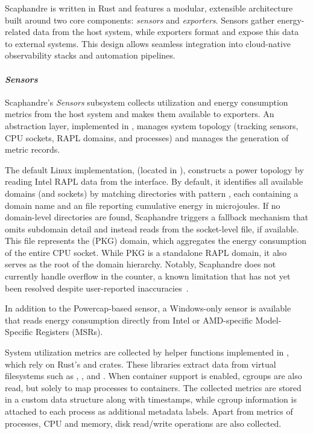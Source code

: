 Scaphandre is written in Rust and features a modular, extensible architecture built around two core components: \textit{sensors} and \textit{exporters}. Sensors gather energy-related data from the host system, while exporters format and expose this data to external systems. This design allows seamless integration into cloud-native observability stacks and automation pipelines.

\paragraph{\textit{Sensors}}

Scaphandre’s \textit{Sensors} subsystem collects utilization and energy consumption metrics from the host system and makes them available to exporters. An abstraction layer, implemented in , manages system topology (tracking sensors, CPU sockets, RAPL domains, and processes) and manages the generation of metric records.

The default Linux implementation,  (located in ), constructs a power topology by reading Intel RAPL data from the  interface. By default, it identifies all available domains (and sockets) by matching directories with pattern , each containing a domain name and an  file reporting cumulative energy in microjoules. If no domain-level directories are found, Scaphandre triggers a fallback mechanism that omits subdomain detail and instead reads from the socket-level file, if available. This file represents the  (PKG) domain, which aggregates the energy consumption of the entire CPU socket. While PKG is a standalone RAPL domain, it also serves as the root of the domain hierarchy. Notably, Scaphandre does not currently handle overflow in the  counter, a known limitation that has not yet been resolved despite user-reported inaccuracies~\cite{scaphandre_issue280}.

In addition to the Powercap-based sensor, a Windows-only sensor is available that reads energy consumption directly from Intel or AMD-specific Model-Specific Registers (MSRs).

System utilization metrics are collected by helper functions implemented in , which rely on Rust’s  and  crates. These libraries extract data from virtual filesystems such as , , and . When container support is enabled, cgroups are also read, but solely to map processes to containers. The collected metrics are stored in a custom data structure along with timestamps, while cgroup information is attached to each process as additional metadata labels. Apart from metrics of processes, CPU and memory, disk read/write operations are also collected.

